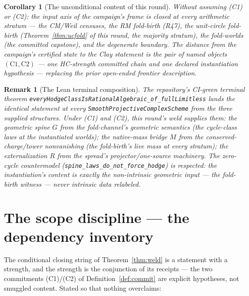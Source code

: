 \documentclass[11pt]{article}
\newtheorem{corollary}[theorem]{Corollary}
\newtheorem{remark}[theorem]{Remark}
\begin{document}
\begin{corollary}[The unconditional content of this round]
\label{cor:uncond}
Without assuming (C1) or (C2): the input axis of the campaign's frame
is closed at every arithmetic stratum --- the CM/Weil censuses, the
RM fold-birth (R47), the unit-circle fold-birth
(Theorem~\ref{thm:ucfold} of this round, the majority stratum), the
fold-worlds (the committed capstone), and the degenerate boundary.
The distance from the campaign's certified state to the Clay
statement is the pair of named objects $(\mathrm{C1},\mathrm{C2})$ ---
one HC-strength committed chain and one declared instantiation
hypothesis --- replacing the prior open-ended frontier description.
\end{corollary}

\begin{remark}[The Lean terminal composition]
The repository's CI-green terminal theorem
\texttt{everyHodgeClassIsRationalAlgebraic\_of\_fullLimitless}
lands the identical statement at every
\texttt{SmoothProjectiveComplexScheme} from the three supplied
structures. Under (C1) and (C2), this round's weld supplies them: the geometric spine $G$
from the fold-channel's geometric semantics (the cycle-class laws at
the instantiated worlds); the native-mass bridge $M$ from the
conserved-charge/tower nonvanishing (the fold-birth's live mass at
every stratum); the externalization $R$ from the spread's
projector/one-source machinery. The zero-cycle countermodel
(\texttt{spine\_laws\_do\_not\_force\_hodge}) is respected: the
instantiation's content is exactly the non-intrinsic geometric input
--- the fold-birth witness --- never intrinsic data relabeled.
\end{remark}

\section{The scope discipline --- the dependency inventory}
\label{sec:scope}

The conditional closing string of Theorem~\ref{thm:weld} is a
statement with a
strength, and the strength is the conjunction of its receipts --- the
two commitments (C1)/(C2) of Definition~\ref{def:commit} are explicit
hypotheses, not smuggled content. Stated
so that nothing overclaims:
\end{document}
